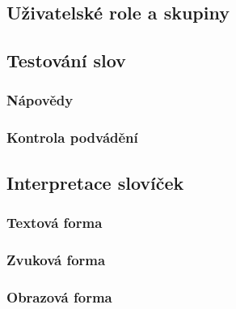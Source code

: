 \documentclass[a4paper,11pt,titlepage,fleqn]{article}
\begin{document}
    \subsection{Uživatelské role a skupiny}

    \subsection{Testování slov}

        \subsubsection{Nápovědy}

        \subsubsection{Kontrola podvádění}

    \subsection{Interpretace slovíček}

        \subsubsection{Textová forma}

        \subsubsection{Zvuková forma}

        \subsubsection{Obrazová forma}
\end{document}
